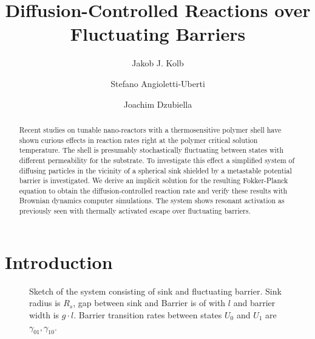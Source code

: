 \documentclass[twocolumn,superscriptaddress]{revtex4}
\begin{document}
 

\title{Diffusion-Controlled Reactions over Fluctuating Barriers} 

\author{Jakob J. Kolb}
\author{Stefano Angioletti-Uberti}
\author{Joachim Dzubiella}



\begin{abstract}
Recent studies on tunable nano-reactors with a thermosensitive polymer shell have shown curious effects in reaction rates
right at the polymer critical solution temperature.
The shell is presumably stochastically fluctuating between states with different permeability for the substrate.
To investigate this effect a simplified system of diffusing particles in the vicinity of a spherical sink shielded by a metastable potential barrier is investigated. We derive an implicit solution for the resulting Fokker-Planck equation to obtain the diffusion-controlled reaction rate and verify these results with Brownian dynamics computer simulations. The system shows resonant activation as previously seen with thermally activated escape over fluctuating barriers.


\end{abstract}

\maketitle

\section{Introduction}


\begin{figure}[H]
    
    \caption{Sketch of the system consisting of sink and fluctuating barrier. Sink radius is $R_s$, gap between sink and Barrier is of with $l$ and barrier width is $g\cdot l$. Barrier transition rates between states $U_0$ and $U_1$ are $\gamma_{01}, \gamma_{10}$.}
\label{fig0}
\end{figure}
\end{document}
